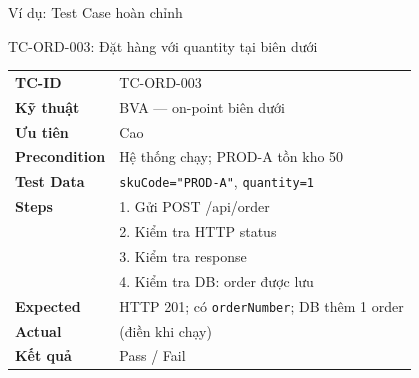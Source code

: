 \documentclass[aspectratio=169,12pt]{beamer}
\begin{document}
\begin{frame}[shrink=6]{Ví dụ: Test Case hoàn chỉnh}
  \begin{exampleblock}{TC-ORD-003: Đặt hàng với quantity tại biên dưới}
    \small
    \renewcommand{\arraystretch}{0.92}
    \begin{tabular}{p{2.6cm}p{7.7cm}}
      \textbf{TC-ID}        & TC-ORD-003 \\
      \textbf{Kỹ thuật}     & BVA --- on-point biên dưới \\
      \textbf{Ưu tiên}      & Cao \\
      \textbf{Precondition} & Hệ thống chạy; PROD-A tồn kho 50 \\
      \textbf{Test Data}    & \texttt{skuCode="PROD-A"}, \texttt{quantity=1} \\
      \textbf{Steps}        & 1. Gửi POST /api/order\\
                            & 2. Kiểm tra HTTP status\\
                            & 3. Kiểm tra response\\
                            & 4. Kiểm tra DB: order được lưu \\
      \textbf{Expected}     & HTTP 201; có \texttt{orderNumber}; DB thêm 1 order \\
      \textbf{Actual}       & (điền khi chạy) \\
      \textbf{Kết quả}      & Pass / Fail \\
    \end{tabular}
    \renewcommand{\arraystretch}{1}
  \end{exampleblock}
\end{frame}
\end{document}
